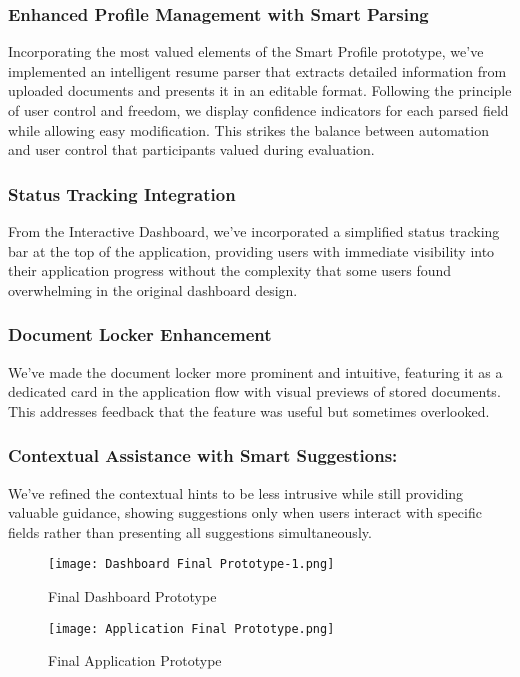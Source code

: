 \documentclass[
	letterpaper, %
]{jdf}
\begin{document}
\begin{sloppypar}
\subsubsection{Enhanced Profile Management with Smart Parsing}
Incorporating the most valued elements of the Smart Profile prototype, we've implemented an intelligent resume parser that extracts detailed information from uploaded documents and presents it in an editable format. Following the principle of user control and freedom, we display confidence indicators for each parsed field while allowing easy modification. This strikes the balance between automation and user control that participants valued during evaluation.

\subsubsection{Status Tracking Integration}
From the Interactive Dashboard, we've incorporated a simplified status tracking bar at the top of the application, providing users with immediate visibility into their application progress without the complexity that some users found overwhelming in the original dashboard design.

\subsubsection{Document Locker Enhancement}
We've made the document locker more prominent and intuitive, featuring it as a dedicated card in the application flow with visual previews of stored documents. This addresses feedback that the feature was useful but sometimes overlooked.

\subsubsection{Contextual Assistance with Smart Suggestions:}
We've refined the contextual hints to be less intrusive while still providing valuable guidance, showing suggestions only when users interact with specific fields rather than presenting all suggestions simultaneously.

\begin{figure}
    \centering
    \texttt{[image: Dashboard Final Prototype-1.png]}
    \caption{Final Dashboard Prototype}
    \label{fig:enter-label}
\end{figure}

\begin{figure}
    \centering
    \texttt{[image: Application Final Prototype.png]}
    \caption{Final Application Prototype}
    \label{fig:enter-label}
\end{figure}


\end{sloppypar}
\end{document}

